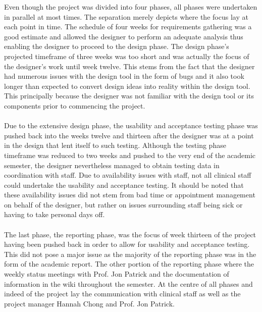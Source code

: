 \noindent Even though the project was divided into four phases, all phases were undertaken in parallel at most times. The separation merely depicts where the focus lay at each point in time. The schedule of four weeks for requirements gathering was a good estimate and allowed the designer to perform an adequate analysis thus enabling the designer to proceed to the design phase. The design phase's projected timeframe of three weeks was too short and was actually the focus of the designer's work until week twelve. This stems from the fact that the designer had numerous issues with the design tool in the form of bugs and it also took longer than expected to convert design ideas into reality within the design tool. This principally because the designer was not familiar with the design tool or its components prior to commencing the project.
\\ \\
Due to the extensive design phase, the usability and acceptance testing phase was pushed back into the weeks twelve and thirteen after the designer was at a point in the design that lent itself to such testing. Although the testing phase timeframe was reduced to two weeks and pushed to the very end of the academic semester, the designer nevertheless managed to obtain testing data in coordination with staff. Due to availability issues with staff, not all clinical staff could undertake the usability and acceptance testing. It should be noted that these availability issues did not stem from bad time or appointment management on behalf of the designer, but rather on issues surrounding staff being sick or having to take personal days off. 
\\ \\
The last phase, the reporting phase, was the focus of week thirteen of the project having been pushed back in order to allow for usability and acceptance testing. This did not pose a major issue as the majority of the reporting phase was in the form of the academic report. The other portion of the reporting phase where the weekly status meetings with Prof. Jon Patrick and the documentation of information in the wiki throughout the semester. At the centre of all phases and indeed of the project lay the communication with clinical staff as well as the project manager Hannah Chong and Prof. Jon Patrick.
